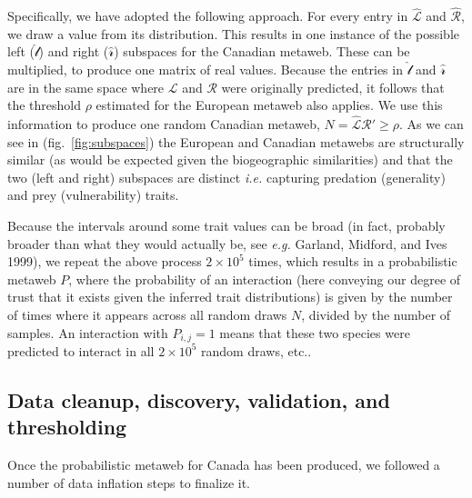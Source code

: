 \documentclass[11pt]{article}
\begin{document}
Specifically, we have adopted the following approach. For every entry in
\(\hat{\mathcal{L}}\) and \(\hat{\mathcal{R}}\), we draw a value from
its distribution. This results in one instance of the possible left
(\(\hat{\mathcal{l}}\)) and right (\(\hat{\mathcal{r}}\)) subspaces for
the Canadian metaweb. These can be multiplied, to produce one matrix of
real values. Because the entries in \(\hat{\mathcal{l}}\) and
\(\hat{\mathcal{r}}\) are in the same space where \(\mathcal{L}\) and
\(\mathcal{R}\) were originally predicted, it follows that the threshold
\(\rho\) estimated for the European metaweb also applies. We use this
information to produce one random Canadian metaweb,
\(N = \hat{\mathcal{L}}\)\(\hat{\mathcal{R}}' \ge \rho\). As we can see
in (fig.~\ref{fig:subspaces}) the European and Canadian metawebs are
structurally similar (as would be expected given the biogeographic
similarities) and that the two (left and right) subspaces are distinct
\emph{i.e.} capturing predation (generality) and prey (vulnerability)
traits.

Because the intervals around some trait values can be broad (in fact,
probably broader than what they would actually be, see \emph{e.g.}
Garland, Midford, and Ives 1999), we repeat the above process
\(2\times 10^5\) times, which results in a probabilistic metaweb \(P\),
where the probability of an interaction (here conveying our degree of
trust that it exists given the inferred trait distributions) is given by
the number of times where it appears across all random draws \(N\),
divided by the number of samples. An interaction with \(P_{i,j} = 1\)
means that these two species were predicted to interact in all
\(2\times 10^5\) random draws, etc..

\hypertarget{data-cleanup-discovery-validation-and-thresholding}{%
\subsection{Data cleanup, discovery, validation, and
thresholding}\label{data-cleanup-discovery-validation-and-thresholding}}

Once the probabilistic metaweb for Canada has been produced, we followed
a number of data inflation steps to finalize it.
\end{document}
